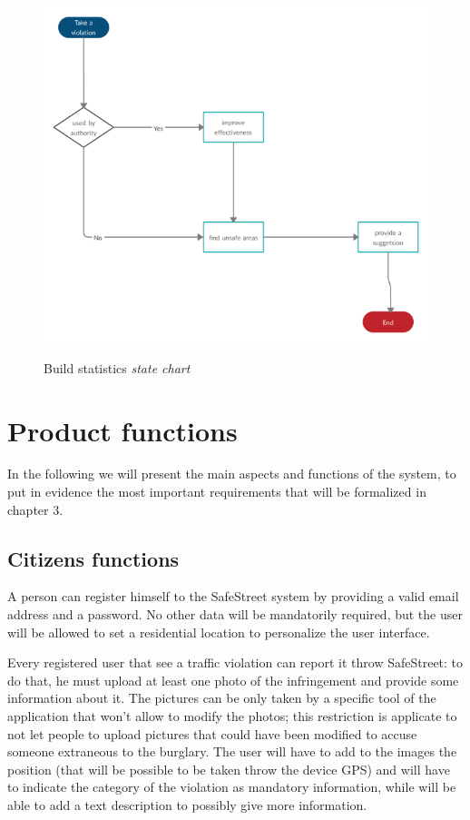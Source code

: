 \documentclass[../RASD.tex]{subfiles}
\begin{document}
    \begin{figure}[H]
        \centering
        \includegraphics[scale = 2.0]{assets/buildStatistics.png}\\[1.6 cm]
        \caption[ Build statistics \textit{state diagram}]{ Build statistics \textit{state chart}}
    \end{figure}

    \section{Product functions}\label{sec:product-functions}
    In the following we will present the main aspects and functions of the system, to put in evidence the most important requirements that will be formalized in chapter 3.
    \subsection{Citizens functions}\label{subsec:citizen-functions}
    A person can register himself to the SafeStreet system by providing a valid email address and a password. No other data will be mandatorily required, but the user will be allowed to set a residential location to personalize the user interface.

    Every registered user that see a traffic violation can report it throw SafeStreet: to do that, he must upload at least one photo of the infringement and provide some information about it. The pictures can be only taken by a specific tool of the application that won't allow to modify the photos; this restriction is applicate to not let people to upload pictures that could have been modified to accuse someone extraneous to the burglary. The user will have to add to the images the position (that will be possible to be taken throw the device GPS) and will have to indicate the category of the violation as mandatory information, while will be able to add a text description to possibly give more information.
\end{document}

